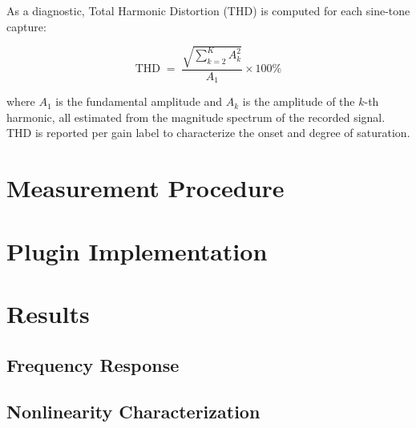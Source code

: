 \documentclass[11pt, letterpaper]{article}
\begin{document}
As a diagnostic, Total Harmonic Distortion (THD) is computed for each
sine-tone capture:

\begin{equation}
    \text{THD} \;=\;
    \frac{\sqrt{\displaystyle\sum_{k=2}^{K} A_k^2}}{A_1} \times 100\%
    \label{eq:thd}
\end{equation}

where $A_1$ is the fundamental amplitude and $A_k$ is the amplitude of the
$k$-th harmonic, all estimated from the magnitude spectrum of the recorded signal.
THD is reported per gain label to characterize the onset and degree of saturation.

\section{Measurement Procedure}
\label{sec:procedure}

\section{Plugin Implementation}
\label{sec:plugin}

\section{Results}
\label{sec:results}

\subsection{Frequency Response}

\subsection{Nonlinearity Characterization}
\end{document}

